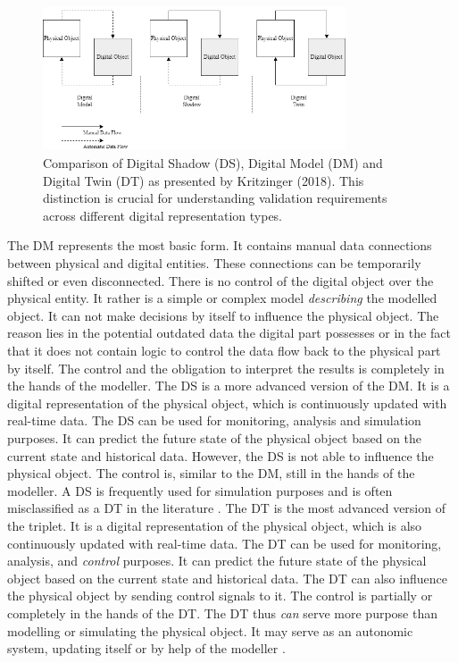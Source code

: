 \begin{figure}[htbp]
  \centering
  \includegraphics[width=0.8\textwidth]{figures/kritzinger.png}
  \caption{Comparison of Digital Shadow (DS), Digital Model (DM) and Digital Twin (DT) as presented by Kritzinger (2018). This distinction is crucial for understanding validation requirements across different digital representation types.}
  \label{fig:Kritzinger}
\end{figure}

The DM represents the most basic form. It contains manual data connections between physical and digital entities. These connections can be temporarily shifted or even disconnected. There is no control of the digital object over the physical entity. It rather is a simple or complex model \textit{describing} the modelled object. It can not make decisions by itself to influence the physical object. The reason lies in the potential outdated data the digital part possesses or in the fact that it does not contain logic to control the data flow back to the physical part by itself. The control and the obligation to interpret the results is completely in the hands of the modeller.
The DS is a more advanced version of the DM. It is a digital representation of the physical object, which is continuously updated with real-time data. The DS can be used for monitoring, analysis and simulation purposes. It can predict the future state of the physical object based on the current state and historical data. However, the DS is not able to influence the physical object. The control is, similar to the DM, still in the hands of the modeller. A DS is frequently used for simulation purposes and is often misclassified as a DT in the literature \parencite{kritzinger2018digital,buildings11040151}.
The DT is the most advanced version of the triplet. It is a digital representation of the physical object, which is also continuously updated with real-time data. The DT can be used for monitoring, analysis, and \textit{control} purposes. It can predict the future state of the physical object based on the current state and historical data. The DT can also influence the physical object by sending control signals to it. The control is partially or completely in the hands of the DT. The DT thus \textit{can} serve more purpose than modelling or simulating the physical object. It may serve as an autonomic system, updating itself or by help of the modeller \parencite{kritzinger2018digital}.

